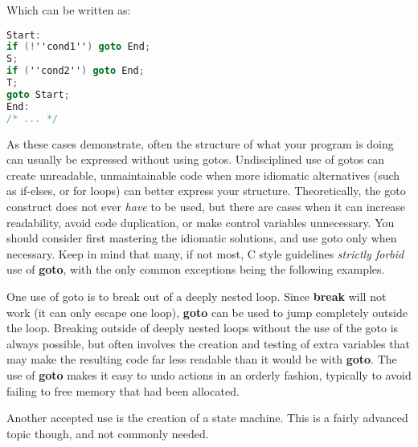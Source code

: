 Which can be written as:
\lstset{basicstyle=\scriptsize, numbers=left, captionpos=b, tabsize=4}
\begin{lstlisting}[caption=Section \thesection listing \arabic{controlcnt},language={C},
breaklines=true,xleftmargin=15pt, label=lst:section\thesection listing\arabic{controlcnt}]
Start:
if (!''cond1'') goto End;
S;
if (''cond2'') goto End;
T;
goto Start;
End:
/* ... */
\end{lstlisting}

As these cases demonstrate, often the structure of what your program is doing
can usually be expressed without using gotos. Undisciplined use of gotos can
create unreadable, unmaintainable code when more idiomatic alternatives (such
as if-elses, or for loops) can better express your structure. Theoretically,
the goto construct does not ever \emph{have} to be used, but there are cases
when it can increase readability, avoid code duplication, or make control
variables unnecessary. You should consider first mastering the idiomatic
solutions, and use goto only when necessary. Keep in mind that many, if not
most, C style guidelines \emph{strictly forbid} use of \textbf{goto}, with the
only common exceptions being the following examples.

One use of goto is to break out of a deeply nested loop. Since \textbf{break}
will not work (it can only escape one loop), \textbf{goto} can be used to jump
completely outside the loop. Breaking outside of deeply nested loops without
the use of the goto is always possible, but often involves the creation and
testing of extra variables that may make the resulting code far less readable
than it would be with \textbf{goto}. The use of \textbf{goto} makes it easy to
undo actions in an orderly fashion, typically to avoid failing to free memory
that had been allocated.

Another accepted use is the creation of a state machine. This is a fairly
advanced topic though, and not commonly needed.
